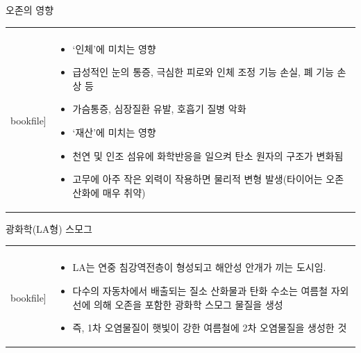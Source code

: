 \begin{frame}[t]{오존의 영향}
	\begin{tabular}{ll}
		\begin{minipage}[t]{0.3\textwidth}\scriptsize
			\begin{figure}[t]
				\texttt{[image: \\bookfile]}
			\end{figure}
		\end{minipage}	
		&
		\begin{minipage}[t]{0.65\textwidth} \scriptsize	
			\begin{itemize}
				\item ‘인체’에 미치는 영향
				\item 급성적인 눈의 통증, 극심한 피로와 인체 조정 기능 손실, 폐 기능 손상 등
				\item 가슴통증, 심장질환 유발, 호흡기 질병 악화
				
				\item ‘재산’에 미치는 영향
				\item 천연 및 인조 섬유에 화학반응을 일으켜 탄소 원자의 구조가 변화됨
				\item 고무에 아주 작은 외력이 작용하면 물리적 변형 발생(타이어는 오존 산화에 매우 취약)
			\end{itemize}

		\end{minipage}
	\end{tabular}
\end{frame}



\begin{frame}[t]{광화학(LA형) 스모그}
	\begin{tabular}{ll}
		\begin{minipage}[t]{0.45\textwidth}\scriptsize
			\begin{figure}[t]
				\texttt{[image: \\bookfile]}
			\end{figure}
		\end{minipage}	
		&
		\begin{minipage}[t]{0.5\textwidth} \scriptsize	
			\begin{itemize}
				\item LA는 연중 침강역전층이 형성되고 해안성 안개가 끼는 도시임.
				\item 다수의 자동차에서 배출되는 질소 산화물과 탄화 수소는 여름철 자외선에 의해 오존을 포함한 광화학 스모그 물질을 생성
				\item 즉, 1차 오염물질이 햇빛이 강한 여름철에 2차 오염물질을 생성한 것
			\end{itemize}

		\end{minipage}
	\end{tabular}
\end{frame}



